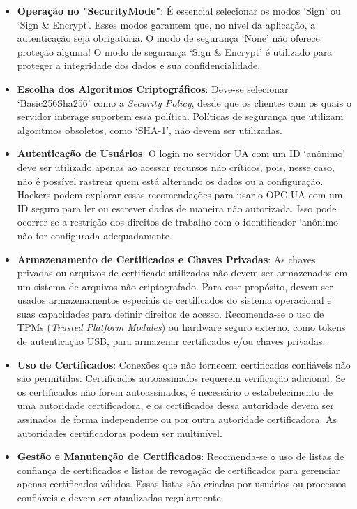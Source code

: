 \begin{itemize}
    \item \textbf{Operação no "SecurityMode"}: É essencial selecionar os modos `Sign' ou `Sign \& Encrypt'. Esses modos garantem que, no nível da aplicação, a autenticação seja obrigatória. O modo de segurança `None' não oferece proteção alguma! O modo de segurança `Sign \& Encrypt' é utilizado para proteger a integridade dos dados e sua confidencialidade.
    \item \textbf{Escolha dos Algoritmos Criptográficos}: Deve-se selecionar `Basic256Sha256' como a \textit{Security Policy}, desde que os clientes com os quais o servidor interage suportem essa política. Políticas de segurança que utilizam algoritmos obsoletos, como `SHA-1', não devem ser utilizadas.
    \item \textbf{Autenticação de Usuários}: O login no servidor UA com um ID `anônimo' deve ser utilizado apenas ao acessar recursos não críticos, pois, nesse caso, não é possível rastrear quem está alterando os dados ou a configuração. Hackers podem explorar essas recomendações para usar o OPC UA com um ID seguro para ler ou escrever dados de maneira não autorizada. Isso pode ocorrer se a restrição dos direitos de trabalho com o identificador `anônimo' não for configurada adequadamente.
    \item \textbf{Armazenamento de Certificados e Chaves Privadas}: As chaves privadas ou arquivos de certificado utilizados não devem ser armazenados em um sistema de arquivos não criptografado. Para esse propósito, devem ser usados armazenamentos especiais de certificados do sistema operacional e suas capacidades para definir direitos de acesso. Recomenda-se o uso de TPMs (\textit{Trusted Platform Modules}) ou hardware seguro externo, como tokens de autenticação USB, para armazenar certificados e/ou chaves privadas.
    \item \textbf{Uso de Certificados}: Conexões que não fornecem certificados confiáveis não são permitidas. Certificados autoassinados requerem verificação adicional. Se os certificados não forem autoassinados, é necessário o estabelecimento de uma autoridade certificadora, e os certificados dessa autoridade devem ser assinados de forma independente ou por outra autoridade certificadora. As autoridades certificadoras podem ser multinível.
    \item \textbf{Gestão e Manutenção de Certificados}: Recomenda-se o uso de listas de confiança de certificados e listas de revogação de certificados para gerenciar apenas certificados válidos. Essas listas são criadas por usuários ou processos confiáveis e devem ser atualizadas regularmente.
\end{itemize}

